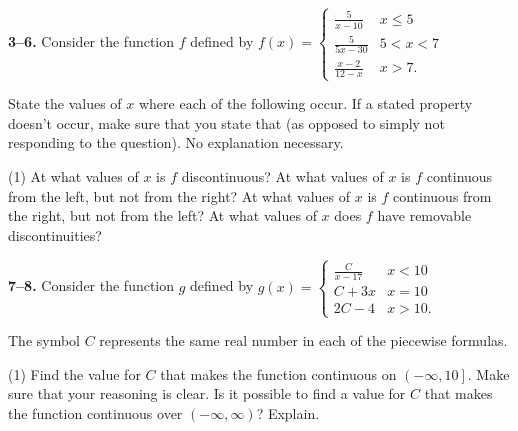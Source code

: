 \documentclass[10pt,oneside,]{book}
\newcommand{\lt}{<}
\newcommand{\gt}{>}
\theoremstyle{plain}
\theoremstyle{definition}
\numberwithin{equation}{section}
\newcommand{\fe}[2]{#1\mathopen{}\left(#2\right)\mathclose{}}
\newcommand{\ointerval}[2]{\left(#1,#2\right)}
\newcommand{\ocinterval}[2]{\left(\left.#1,#2\right]\right.}
\begin{document}
\par\smallskip\noindent
\textbf{3--6. }\hypertarget{exercisegroup-29}{\null}Consider the function \(f\) defined by \(\fe{f}{x}=\begin{cases}\frac{5}{x-10}&x\leq5\\\frac{5}{5x-30}&5\lt x\lt7\\\frac{x-2}{12-x}&x>7\text{.}\end{cases}\)%
\par
State the values of \(x\) where each of the following occur. If a stated property doesn't occur, make sure that you state that (as opposed to simply not responding to the question). No explanation necessary.%
\par
\begin{exercisegroup}(1)
\exercise[3.]\hypertarget{exercise-131}{\null}At what values of \(x\) is \(f\) discontinuous?%
\exercise[4.]\hypertarget{exercise-132}{\null}At what values of \(x\) is \(f\) continuous from the left, but not from the right?%
\exercise[5.]\hypertarget{exercise-133}{\null}At what values of \(x\) is \(f\) continuous from the right, but not from the left?%
\exercise[6.]\hypertarget{exercise-134}{\null}At what values of \(x\) does \(f\) have removable discontinuities?%
\end{exercisegroup}
\par\smallskip\noindent
\textbf{7--8. }\hypertarget{exercisegroup-30}{\null}Consider the function \(g\) defined by \(\fe{g}{x}=\begin{cases}\frac{C}{x-17}&x\lt10\\C+3x&x=10\\2C-4&x\gt10\text{.}\end{cases}\)%
\par
The symbol \(C\) represents the same real number in each of the piecewise formulas.%
\par
\begin{exercisegroup}(1)
\exercise[7.]\hypertarget{exercise-135}{\null}Find the value for \(C\) that makes the function continuous on \(\ocinterval{-\infty}{10}\). Make sure that your reasoning is clear.%
\exercise[8.]\hypertarget{exercise-136}{\null}Is it possible to find a value for \(C\) that makes the function continuous over \(\ointerval{-\infty}{\infty}\)? Explain.%
\end{exercisegroup}
\par\smallskip\noindent
\typeout{************************************************}
\typeout{************************************************}
\end{document}
